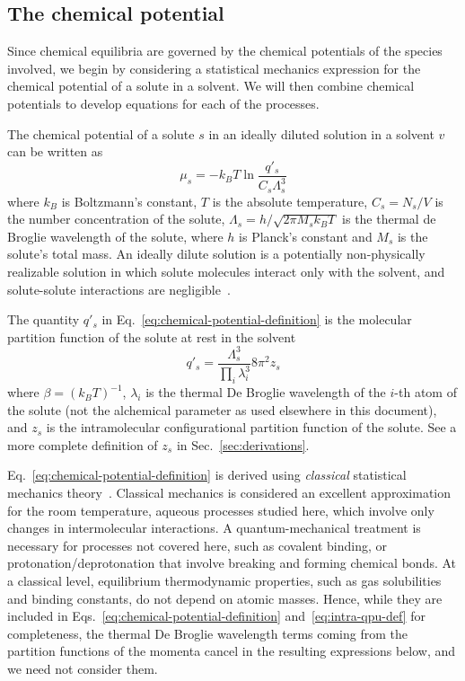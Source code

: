 \documentclass[9pt,bestpractices]{livecoms}
\begin{document}
\subsection{The chemical potential}
\label{sec:chemical_potential}
Since chemical equilibria are governed by the chemical potentials of the species involved, we begin by considering a statistical mechanics expression for the chemical potential of a solute in a solvent. We will then combine chemical potentials to develop equations for each of the processes.

The chemical potential of a solute $s$ in an ideally diluted solution in a solvent $v$ can be written as~\cite{guggenheim1952mixtures504,gilson1997statisticalthermodynamic,gilson2007calculation}
\begin{equation}
  \mu_s = -k_B T \ln \frac{q'_s}{C_s \Lambda_s^3}
  \label{eq:chemical-potential-definition}
\end{equation}
where $k_B$ is Boltzmann's constant, $T$ is the absolute temperature, $C_s = N_s/V$ is the number concentration of the solute, $\Lambda_s = h/\sqrt{2 \pi M_s k_B T}$ is the thermal de Broglie wavelength of the solute, where $h$ is Planck's constant and $M_s$ is the solute's total mass. 
An ideally dilute solution is a potentially non-physically realizable solution in which solute molecules interact only with the solvent, and solute-solute interactions are negligible~\cite{levine2009physicalchemistrybook6ed}.

The quantity $q'_s$ in Eq.~\ref{eq:chemical-potential-definition} is the molecular partition function of the solute at rest in the solvent
\begin{equation}
  q'_s = \frac{\Lambda_s^3}{\prod_i \lambda_i^3} 8 \pi^2 z_s
  \label{eq:intra-qpu-def}
\end{equation}
where $\beta = (k_B T)^{-1}$, $\lambda_i$ is the thermal De Broglie wavelength of the $i$-th atom of the solute (not the alchemical parameter as used elsewhere in this document), and $z_s$ is the intramolecular configurational partition function of the solute. See a more complete definition of $z_s$ in Sec.~\ref{sec:derivations}.

Eq.~\ref{eq:chemical-potential-definition} is derived using \textit{classical} statistical mechanics theory~\cite{hill1986statthermo}. Classical mechanics is considered an excellent approximation for the room temperature, aqueous processes studied here, which involve only changes in intermolecular interactions. A quantum-mechanical treatment is necessary for processes not covered here, such as covalent binding, or protonation/deprotonation that involve breaking and forming chemical bonds. At a classical level, equilibrium thermodynamic properties, such as gas solubilities and binding constants, do not depend on atomic masses. Hence, while they are included in Eqs.~\ref{eq:chemical-potential-definition} and~\ref{eq:intra-qpu-def} for completeness, the thermal De Broglie wavelength terms coming from the partition functions of the momenta cancel in the resulting expressions below, and we need not consider them.
\end{document}
